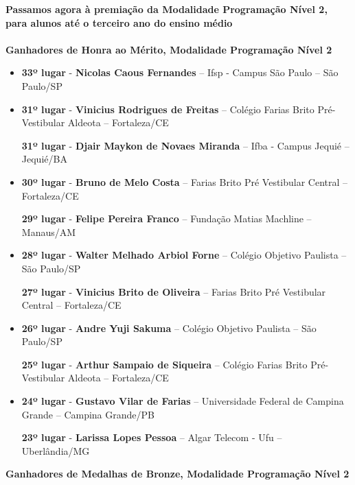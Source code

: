 \documentclass{article}
\begin{document}
\color{blue}
\textbf{Passamos agora à premiação da Modalidade Programação Nível 2, para alunos até o terceiro ano do ensino médio}\\\\
\textbf{\color{blue}Ganhadores de Honra ao Mérito, \color{black}Modalidade Programação Nível 2}
\color{black}

\begin{itemize}
\item
\textbf{33º lugar} - \textbf{Nicolas Caous Fernandes} – Ifsp - Campus São Paulo – São Paulo/SP


\item
\textbf{31º lugar} - \textbf{Vinicius Rodrigues de Freitas} – Colégio Farias Brito Pré- Vestibular Aldeota – Fortaleza/CE


\textbf{31º lugar} - \textbf{Djair Maykon de Novaes Miranda} – Ifba - Campus Jequié – Jequié/BA



\item
\textbf{30º lugar} - \textbf{Bruno de Melo Costa} – Farias Brito Pré Vestibular Central – Fortaleza/CE


\textbf{29º lugar} - \textbf{Felipe Pereira Franco} – Fundação Matias Machline – Manaus/AM



\item
\textbf{28º lugar} - \textbf{Walter Melhado Arbiol Forne} – Colégio Objetivo Paulista – São Paulo/SP


\textbf{27º lugar} - \textbf{Vinicius Brito de Oliveira} – Farias Brito Pré Vestibular Central – Fortaleza/CE



\item
\textbf{26º lugar} - \textbf{Andre Yuji Sakuma} – Colégio Objetivo Paulista – São Paulo/SP


\textbf{25º lugar} - \textbf{Arthur Sampaio de Siqueira} – Colégio Farias Brito Pré- Vestibular Aldeota – Fortaleza/CE



\item
\textbf{24º lugar} - \textbf{Gustavo Vilar de Farias} – Universidade Federal de Campina Grande – Campina Grande/PB


\textbf{23º lugar} - \textbf{Larissa Lopes Pessoa} – Algar Telecom - Ufu – Uberlândia/MG



\end{itemize}

\textbf{\color{blue}Ganhadores de Medalhas de Bronze, \color{black}Modalidade Programação Nível 2}
\color{black}
\end{document}
